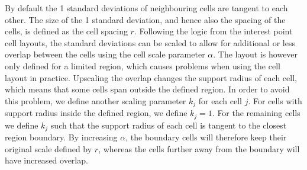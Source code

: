 \documentclass[thesis.tex]{subfiles}
\begin{document}
By default the 1 standard deviations of neighbouring cells are tangent to each other. The size of the 1 standard deviation, and hence also the spacing of the cells, is defined as the cell spacing $r$. Following the logic from the interest point cell layouts, the standard deviations can be scaled to allow for additional or less overlap between the cells using the cell scale parameter $\alpha$.
The layout is however only defined for a limited region, which causes problems when using the cell layout in practice. Upscaling the overlap changes the support radius of each cell, which means that some cells span outside the defined region. In order to avoid this problem, we define another scaling parameter $k_j$ for each cell $j$. For cells with support radius inside the defined region, we define $k_j = 1$. For the remaining cells we define $k_j$ such that the support radius of each cell is tangent to the closest region boundary.
By increasing $\alpha$, the boundary cells will therefore keep their original scale defined by $r$, whereas the cells further away from the boundary will have increased overlap.
%
\end{document}
